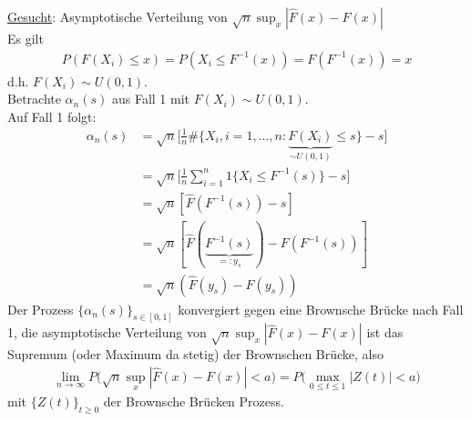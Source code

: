 \documentclass[a4paper,openany]{book}
\theoremstyle{mytheoremstyle}
\theoremstyle{mytheoremstyle2}
\begin{document}
\underline{Gesucht}: Asymptotische Verteilung von $\sqrt{n}\sup _{x}|\hat{F}(x)-F(x)| $ \\
Es gilt 
\begin{align*}
  P(F(X_i)\leq x)=P(X_i \leq F ^{-1}(x))=F(F ^{-1}(x))=x
\end{align*}
d.h. $F(X_i)\sim U(0,1) $. \\
Betrachte $\alpha _n(s) $ aus Fall 1 mit $F(X_i)\sim U(0,1) $. \\
Auf Fall 1 folgt:
\begin{align*}
  \alpha _n(s)
  &=\sqrt{n}\bigg[\frac{1}{n}\#\{X_i,i=1,...,n:\underbrace{F(X_i)}_{\sim U(0,1)}\leq s\}-s\bigg]\\
  &=\sqrt{n}\bigg[\frac{1}{n}\sum_{i=1}^{n}{1\{X_i \leq F ^{-1}(s)\}}-s\bigg]\\
  &=\sqrt{n}[\hat{F}(F ^{-1}(s))-s]\\
  &=\sqrt{n}[\hat{F}(\underbrace{F ^{-1}(s)}_{=:y_s})-F(F ^{-1}(s))]\\
  &=\sqrt{n}(\hat{F}(y_s)-F(y_s))
\end{align*}
Der Prozess $\{\alpha _n(s)\}_{s \in [0,1]} $ konvergiert gegen eine Brownsche Brücke nach Fall 1, die asymptotische Verteilung von $\sqrt{n}\sup _x|\hat{F}(x)-F(x)| $ ist das Supremum (oder Maximum da stetig) der Brownschen Brücke, also
\begin{align*}
  \lim_{n\to \infty }{P\bigg(\sqrt{n}\sup _x|\hat{F}(x)-F(x)|<a \bigg)}=P\bigg(\max _{0 \leq t \leq 1}|Z(t)|<a\bigg)
\end{align*}
mit $\{Z(t)\}_{t \geq 0} $ der Brownsche Brücken Prozess.
\end{document}
